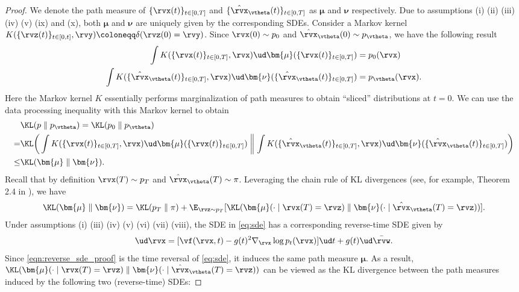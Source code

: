 \begin{proof}
We denote the path measure of $\{\rvx(t)\}_{t\in[0,T]}$ and $\{\hat{\rvx}_\vtheta(t)\}_{t\in[0,T]}$ as $\bm{\mu}$ and $\bm{\nu}$ respectively. Due to assumptions (i) (ii) (iii) (iv) (v) (ix) and (x), both $\bm{\mu}$ and $\bm{\nu}$ are uniquely given by the corresponding SDEs. Consider a Markov kernel $K(\{\rvz(t)\}_{t\in[0,t]}, \rvy) \coloneqq \delta(\rvz(0) = \rvy)$. Since $\rvx(0) \sim p_0$ and $\hat{\rvx}_\vtheta(0) \sim p_\vtheta$, we have the following result
\begin{align*}
    \int K(\{\rvx(t)\}_{t\in[0,T]}, \rvx) \ud \bm{\mu}(\{\rvx(t)\}_{t\in[0,T]}) &= p_0(\rvx)\\
    \int K(\{\hat{\rvx}_\vtheta(t)\}_{t\in[0,T]}, \rvx) \ud \bm{\nu}(\{\hat{\rvx}_\vtheta(t)\}_{t\in[0,T]}) &= p_\vtheta(\rvx).
\end{align*}
Here the Markov kernel $K$ essentially performs marginalization of path measures to obtain ``sliced'' distributions at $t = 0$. We can use the data processing inequality with this Markov kernel to obtain
\begin{align}
    &\KL(p \mathrel\| p_\vtheta) =\KL(p_0 \mathrel\| p_\vtheta)  \notag\\
    = & \KL\bigg(\int K(\{\rvx(t)\}_{t\in[0,T]}, \rvx) \ud \bm{\mu}(\{\rvx(t)\}_{t\in[0,T]})\mathrel\bigg\| \int K(\{\hat{\rvx}_\vtheta(t)\}_{t\in[0,T]}, \rvx) \ud \bm{\nu}(\{\hat{\rvx}_\vtheta(t)\}_{t\in[0,T]})\bigg)\notag \\
    \leq & \KL(\bm{\mu}\mathrel\| \bm{\nu}).\label{eqn:data_processing}
\end{align}
Recall that by definition $\rvx(T) \sim p_T$ and $\hat{\rvx}_\vtheta(T) \sim \pi$. Leveraging the chain rule of KL divergences (see, for example, Theorem 2.4 in \cite{leonard2014some}), we have
\begin{align}
    \KL(\bm{\mu} \mathrel\| \bm{\nu}) = \KL(p_T \mathrel\| \pi ) + \E_{\rvz \sim p_T}[\KL(\bm{\mu}(\cdot \mid \rvx(T) = \rvz) \mathrel\| \bm{\nu}(\cdot \mid \hat{\rvx}_\vtheta(T) = \rvz))].\label{eqn:chain_rule}
\end{align}
Under assumptions (i) (iii) (iv) (v) (vi) (vii) (viii), the SDE in \cref{eq:sde} has a corresponding reverse-time SDE given by
\begin{align}
\ud \rvx = [\vf(\rvx, t) - g(t)^2 \nabla_\rvx \log p_t(\rvx)]\ud t + g(t) \ud \bar{\rvw}. \label{eqn:reverse_sde_proof}
\end{align}
Since \cref{eqn:reverse_sde_proof} is the time reversal of \cref{eq:sde}, it induces the same path measure $\bm{\mu}$. As a result, $\KL(\bm{\mu}(\cdot \mid \rvx(T) = \rvz)\mathrel\| \bm{\nu}(\cdot \mid \hat{\rvx}_\vtheta(T) = \rvz))$ can be viewed as the KL divergence between the path measures induced by the following two (reverse-time) SDEs:

\end{proof}
